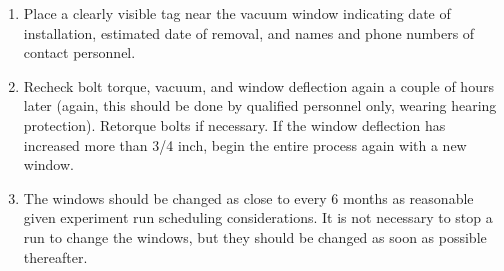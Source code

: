 {\begin{enumerate}
\item{Place a clearly visible tag near the vacuum window indicating
date of installation, estimated date of removal, and names and phone
numbers of contact personnel.}

\item{Recheck bolt torque, vacuum, and window deflection
again a couple of hours later (again, this should be done by
qualified personnel only, wearing hearing
protection). Retorque bolts if necessary.
If the window deflection has increased more than 3/4 inch, begin the entire
process again with a new window.}

\item{The windows should be changed as close to every 6 months as
reasonable given experiment run scheduling considerations. It is not
necessary to stop a run to change the windows, but they should be changed
as soon as possible thereafter.}

\end{enumerate}
} %



